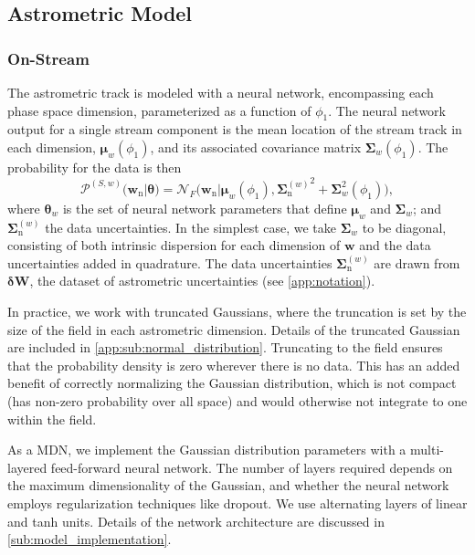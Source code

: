 \documentclass[twocolumn]{aastex631}
\newcommand{\mrm}[1]{\mathrm{#1}}
\newcommand{\mbs}[1]{\boldsymbol{#1}}
\newcommand{\mbf}[1]{\mathbf{#1}}
\newcommand{\mcal}[1]{\mathcal{#1}}
\newcommand{\pdf}{\mcal{P}}
\newcommand{\nth}[1]{{#1}_{\mrm{n}}}  %
\newcommand{\smallcomponent}[2]{#2^{\scriptscriptstyle (#1)}}
\newcommand{\cmp}[2]{\smallcomponent{#1}{#2}}
\newcommand{\astroM}[1]{{#1}_w}
\begin{document}
    
        
    \subsection{Astrometric Model} \label{sub:astrometric_model}

        \subsubsection{On-Stream} \label{ssub:astrometric_model_on_stream}
    
            The astrometric track is modeled with a neural network, encompassing each phase space dimension, parameterized as a function of $\phi_1$. The neural network output for a single stream component is the mean location of the stream track in each dimension, $\astroM{\mbs{\mu}}(\phi_1)$, and its associated covariance matrix $\astroM{\mbs{\Sigma}}(\phi_1)$. The probability for the data is then
            \begin{equation}
                \cmp{S,w}{\pdf}(\nth{\mbs{w}} | \mbs{\theta}) \! = \mcal{N}_F \big(\nth{\mbs{w}} | \astroM{\mbs{\mu}}\!(\phi_1), {\cmp{w}{\nth{\mbs{\Sigma}}}}^2 \! + \!  \astroM{\mbs{\Sigma}}^2\!\left(\phi_1\right) \!\big),
            \end{equation}
            where $\astroM{\mbs{\theta}}$ is the set of neural network parameters that define $\astroM{\mbs{\mu}}$ and $\astroM{\mbs{\Sigma}}$; and $\cmp{w}{\nth{\mbs{\Sigma}}}$ the data uncertainties.
            In the simplest case, we take $\astroM{\mbs{\Sigma}}$ to be diagonal, consisting of both intrinsic dispersion for each dimension of $\mbs{w}$ and the data uncertainties added in quadrature. The data uncertainties $\cmp{w}{\nth{\mbs{\Sigma}}}$ are drawn from $\mbs{\delta}\mbf{W}$, the dataset of astrometric uncertainties (see \autoref{app:notation}).

            In practice, we work with truncated Gaussians, where the truncation is set by the size of the field in each astrometric dimension. Details of the truncated Gaussian are included in \autoref{app:sub:normal_distribution}. Truncating to the field ensures that the probability density is zero wherever there is no data. This has an added benefit of correctly normalizing the Gaussian distribution, which is not compact (has non-zero probability over all space) and would otherwise not integrate to one within the field.

            As a MDN, we implement the Gaussian distribution parameters with a multi-layered feed-forward neural network. The number of layers required depends on the maximum dimensionality of the Gaussian, and whether the neural network employs regularization techniques like dropout. We use alternating layers of linear and tanh units. Details of the network architecture are discussed in \autoref{sub:model_implementation}.
\end{document}
